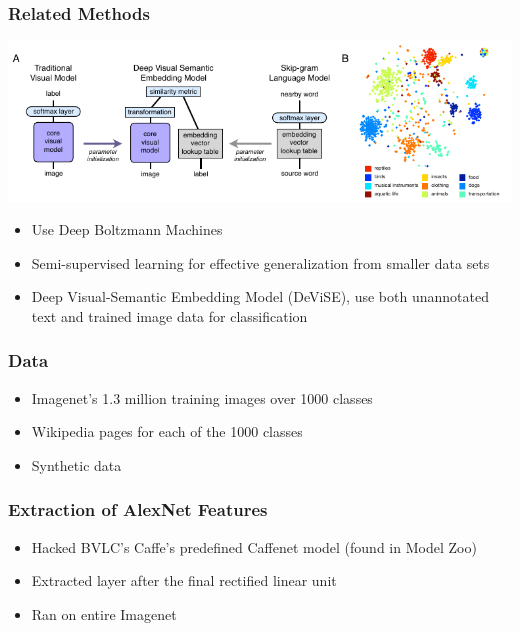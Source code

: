 \documentclass{beamer}
\begin{document}
\begin{frame}
  \frametitle{Related Methods}
  \begin{center}
    \includegraphics[width=\textwidth]{assets/devise.pdf}
  \end{center}
  \begin{itemize}
  \item Use Deep Boltzmann Machines \citep{Srivastava14}
  \item Semi-supervised learning for effective generalization from smaller data sets \citep{Kingma14b}
  \item Deep Visual-Semantic Embedding Model (DeViSE), use both unannotated text and trained image data for classification \citep{Frome13}
  \end{itemize}
\end{frame}

\begin{frame}
  \frametitle{Data}
  \begin{itemize}
    \item Imagenet's 1.3 million training images over 1000 classes
    \item Wikipedia pages for each of the 1000 classes
    \item Synthetic data
  \end{itemize}
\end{frame}

\begin{frame}
  \frametitle{Extraction of AlexNet Features}
  \begin{itemize}
    \item Hacked BVLC's Caffe's predefined Caffenet model (found in Model Zoo)
    \item Extracted layer after the final rectified linear unit
    \item Ran on entire Imagenet
  \end{itemize}
\end{frame}
\end{document}
